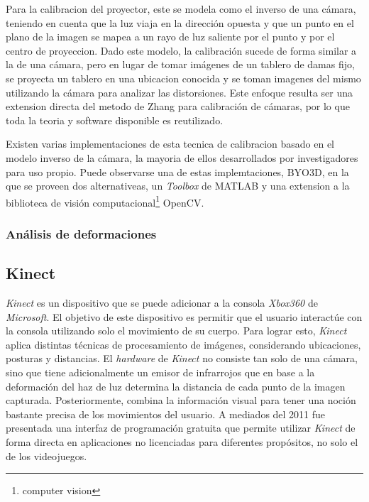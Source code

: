 Para la calibracion del proyector, este se modela como el inverso de una cámara, teniendo en cuenta que la luz viaja en la dirección opuesta y que un punto en el plano de la imagen se mapea a un rayo de luz saliente por el punto y por el centro de proyeccion. Dado este modelo, la calibración sucede de forma similar a la de una cámara, pero en lugar de tomar imágenes de un tablero de damas fijo, se proyecta un tablero en una ubicacion conocida y se toman imagenes del mismo utilizando la cámara para analizar las distorsiones. Este enfoque resulta ser una extension directa del metodo de Zhang para calibración de cámaras, por lo que toda la teoria y software disponible es reutilizado.  

Existen varias implementaciones de esta tecnica de calibracion basado en el modelo inverso de la cámara, la mayoria de ellos desarrollados por investigadores para uso propio. Puede observarse una de estas implemtaciones, BYO3D\cite{BYO3D}, en la que se proveen dos alternativeas, un \emph{Toolbox} de MATLAB\cite{MATLAB} y una extension a la biblioteca de visión computacional\footnote{computer vision} OpenCV\cite{OpenCV}.


\subsubsection{Análisis de deformaciones}

\subsection{Kinect}

\emph{Kinect} es un dispositivo que se puede adicionar a la consola \emph{Xbox360} de \emph{Microsoft}. El objetivo de este dispositivo es permitir que el usuario interactúe con la consola utilizando solo el movimiento de su cuerpo. Para lograr esto, \emph{Kinect} aplica distintas técnicas de procesamiento de imágenes, considerando ubicaciones, posturas y distancias. El \emph{hardware} de \emph{Kinect} no consiste tan solo de una cámara, sino que tiene adicionalmente un emisor de infrarrojos que en base a la deformación del haz de luz determina la distancia de cada punto de la imagen capturada. Posteriormente, combina la información visual para tener una noción bastante precisa de los movimientos del usuario. A mediados del 2011 fue presentada una interfaz de programación gratuita que permite utilizar \emph{Kinect} de forma directa en aplicaciones no licenciadas para diferentes propósitos, no solo el de los videojuegos.

